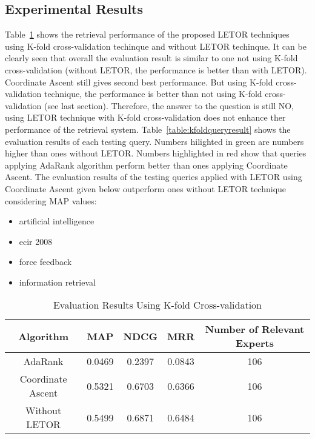 \subsection{Experimental Results}

Table~\ref{table:kfoldevaluationresult} shows the retrieval performance of the proposed LETOR techniques using K-fold cross-validation techinque
and without LETOR techinque.
It can be clearly seen that overall the evaluation result is similar to one not using K-fold cross-validation (without LETOR, the performance is better than
with LETOR). Coordinate Ascent still gives second best performance. But using K-fold cross-validation technique, the performance is better than
not using K-fold cross-validation (see last section). Therefore, the answer
to the question is still NO, using LETOR technique with K-fold cross-validation does not enhance ther performance of the retrieval system.
Table~\ref{table:kfoldqueryresult} shows the evaluation results of each testing query. Numbers hilighted in green are numbers higher
than ones without LETOR. Numbers highlighted in red show that queries applying AdaRank algorithm perform better than ones applying Coordinate Ascent.
The evaluation results of the testing queries applied with LETOR using Coordinate Ascent given below outperform ones without LETOR technique considering MAP values:
\begin{itemize}
 \item artificial intelligence
 \item ecir 2008
 \item force feedback
 \item information retrieval
\end{itemize}


\begin{table}
\centering
\begin{tabular}{|c|c|c|c|c|}
\hline \textbf{Algorithm} & \textbf{MAP} & \textbf{NDCG} & \textbf{MRR} & \textbf{Number of Relevant Experts}\\
\hline AdaRank & 0.0469 & 0.2397 & 0.0843 & 106 \\
\hline Coordinate Ascent & 0.5321 & 0.6703 & 0.6366 & 106 \\
\hline Without LETOR  & 0.5499 & 0.6871 & 0.6484 & 106 \\ 
\hline
\end{tabular}
\caption{Evaluation Results Using K-fold Cross-validation} \label{table:kfoldevaluationresult}
\end{table}

